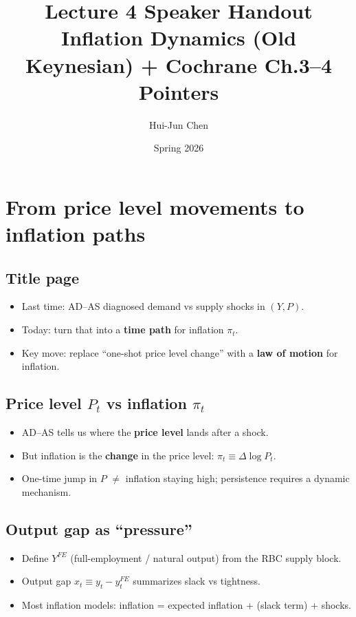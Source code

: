 \documentclass[11pt]{article}
\title{Lecture 4 Speaker Handout\\[-2pt]\large Inflation Dynamics (Old Keynesian) + Cochrane Ch.3--4 Pointers}
\author{Hui-Jun Chen}
\date{Spring 2026}
\begin{document}
\maketitle

\section{From price level movements to inflation paths}

\subsection*{Title page}
\begin{itemize}
\item Last time: AD--AS diagnosed demand vs supply shocks in $(Y,P)$.
\item Today: turn that into a \textbf{time path} for inflation $\pi_t$.
\item Key move: replace ``one-shot price level change'' with a \textbf{law of motion} for inflation.
\end{itemize}

\subsection*{Price level $P_t$ vs inflation $\pi_t$}
\begin{itemize}
\item AD--AS tells us where the \textbf{price level} lands after a shock.
\item But inflation is the \textbf{change} in the price level: $\pi_t \equiv \Delta\log P_t$.
\item One-time jump in $P$ $\neq$ inflation staying high; persistence requires a dynamic mechanism.
\end{itemize}

\subsection*{Output gap as ``pressure''}
\begin{itemize}
\item Define $Y^{FE}$ (full-employment / natural output) from the RBC supply block.
\item Output gap $x_t \equiv y_t - y_t^{FE}$ summarizes slack vs tightness.
\item Most inflation models: inflation = expected inflation + (slack term) + shocks.
\end{itemize}
\end{document}

